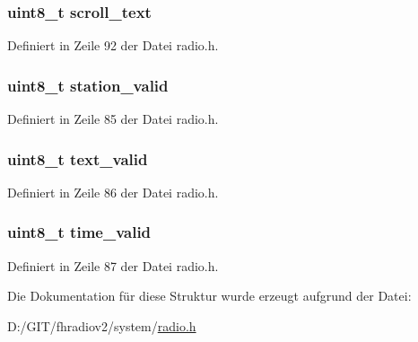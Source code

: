 \subsubsection[{scroll\+\_\+text}]{\setlength{\rightskip}{0pt plus 5cm}uint8\+\_\+t scroll\+\_\+text}\label{structradio__status_a16198f5b3b66ddcf01c81f6177af500f}


Definiert in Zeile 92 der Datei radio.\+h.

\hypertarget{structradio__status_ad84d780e2e45afd62830f27f2d4dbd9a}{}
\subsubsection[{station\+\_\+valid}]{\setlength{\rightskip}{0pt plus 5cm}uint8\+\_\+t station\+\_\+valid}\label{structradio__status_ad84d780e2e45afd62830f27f2d4dbd9a}


Definiert in Zeile 85 der Datei radio.\+h.

\hypertarget{structradio__status_a6a0d33cd9094edee0dad3deb6b386914}{}
\subsubsection[{text\+\_\+valid}]{\setlength{\rightskip}{0pt plus 5cm}uint8\+\_\+t text\+\_\+valid}\label{structradio__status_a6a0d33cd9094edee0dad3deb6b386914}


Definiert in Zeile 86 der Datei radio.\+h.

\hypertarget{structradio__status_a11ae5e5b507c175049a332002aa85849}{}
\subsubsection[{time\+\_\+valid}]{\setlength{\rightskip}{0pt plus 5cm}uint8\+\_\+t time\+\_\+valid}\label{structradio__status_a11ae5e5b507c175049a332002aa85849}


Definiert in Zeile 87 der Datei radio.\+h.



Die Dokumentation für diese Struktur wurde erzeugt aufgrund der Datei\+:\begin{DoxyCompactItemize}
\item 
D\+:/\+G\+I\+T/fhradiov2/system/\hyperlink{radio_8h}{radio.\+h}\end{DoxyCompactItemize}
